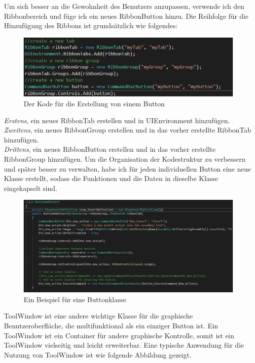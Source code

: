 \documentclass[14pt,a4paper,titlepage]{article}
\begin{document}
\begin{itemize}
				Um sich besser an die Gewohnheit des Benutzers anzupassen, verwende ich den Ribbonbereich und füge ich ein neues RibbonButton hinzu. 
				\bigbreak
				Die Reihfolge für die Hinzufügung des Ribbons ist grundsätzlich wie folgendes:\\
					\begin{figure}[h!]
						\centering
						\includegraphics[width=0.8\linewidth]{createbutton.png}
						\caption{Der Kode für die Erstellung von einem Button}
					\end{figure}
				\pagebreak
				\emph{Erstens}, ein neues RibbonTab erstellen und in UIEnvironment hinzufügen.\\
				\emph{Zweitens},
				 ein neues RibbonGroup erstellen und in das vorher erstellte RibbonTab hinzufügen.\\
				\emph{Drittens},
				 ein neues RibbonButton erstellen und in das vorher erstellte RibbonGroup hinzufügen.
				\bigbreak
				Um die Organisation der Kodestruktur zu verbessern und später besser zu verwalten, habe ich für jeden individuellen Button eine neue Klasse erstellt, sodass die Funktionen und die Daten in dieselbe Klasse eingekapselt sind.
				\bigbreak  
				\begin{figure}[h!]
					\centering
					\includegraphics[width=0.8\linewidth]{buttonclass.png}
					\caption{Ein Beispiel für eine Buttonklasse}
				\end{figure}
				ToolWindow ist eine andere wichtige Klasse für die graphische Benutzeroberfläche, die multifunktional als ein einziger Button ist. Ein ToolWindow ist ein Container für andere graphische Kontrolle, somit ist ein ToolWindow vielseitig und leicht erweiterbar.  Eine typische Anwendung für die Nutzung von ToolWindow ist wie folgende Abbildung gezeigt. \\

\end{itemize}
\end{document}

